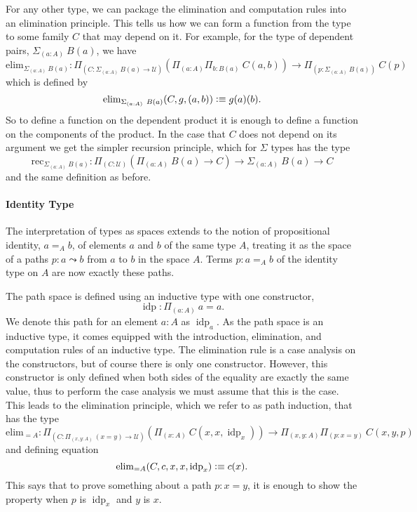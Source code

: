 \documentclass[12pt, parskip, DIV=14]{scrbook}
\newcommand{\defeq}{\vcentcolon\equiv}
\newcommand{\idp}{\operatorname{idp}}
\begin{document}
For any other type, we can package the elimination and computation rules into an elimination principle. This tells us how we can form a function from the type to some family $C$ that may depend on it. For example, for the type of dependent pairs, $\Sigma_{(a : A)}~B(a)$, we have
$$\mathrm{elim}_{\Sigma_{(a : A)}~B(a)} : \Pi_{(C : \Sigma_{(a : A)}~B(a) \to \mathcal{U})}(\Pi_{(a : A)}\Pi_{b : B(a)}~C(a,b)) \to \Pi_{(p : \Sigma_{(a : A)}~B(a))}~C(p)$$ which is defined by $$\mathrm{elim}_{\Sigma_{(a : A)}~B(a)}(C,g,(a,b)) \defeq g(a)(b).$$ So to define a function on the dependent product it is enough to define a function on the components of the product. In the case that $C$ does not depend on its argument we get the simpler recursion principle, which for $\Sigma$ types has the type
$$\mathrm{rec}_{\Sigma_{(a : A)}~B(a)} : \Pi_{(C : \mathcal{U})}(\Pi_{(a : A)}~B(a) \to C) \to \Sigma_{(a : A)}~B(a) \to C$$ and the same definition as before.

\paragraph{Identity Type}

The interpretation of types as spaces extends to the notion of propositional identity, $a =_A b$, of elements $a$ and $b$ of the same type $A$, treating it as the space of a paths $p : a \leadsto b$ from $a$ to $b$ in the space $A$. Terms $p : a =_A b$ of the identity type on $A$ are now exactly these paths.

The path space is defined using an inductive type with one constructor, $$\idp : \Pi_{(a : A)}~a = a.$$ We denote this path for an element $a : A$ as $\idp_a$. As the path space is an inductive type, it comes equipped with the introduction, elimination, and computation rules of an inductive type. The elimination rule is a case analysis on the constructors, but of course there is only one constructor. However, this constructor is only defined when both sides of the equality are exactly the same value, thus to perform the case analysis we must assume that this is the case. This leads to the elimination principle, which we refer to as path induction, that has the type
$$\mathrm{elim}_{=A} : \Pi_{(C : \Pi_{(x,y : A)}~(x = y) \to \mathcal{U})} (\Pi_{(x:A)}~C(x,x,\idp_x)) \to \Pi_{(x,y : A)}\Pi_{(p : x = y)}~C(x,y,p)$$ and defining equation $$\mathrm{elim}_{=A}(C,c,x,x,\idp_x) \defeq c(x).$$ This says that to prove something about a path $p : x = y$, it is enough to show the property when $p$ is $\idp_x$ and $y$ is $x$.
\end{document}
